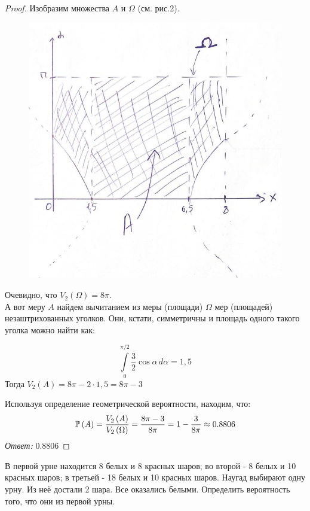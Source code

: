 \begin{proof}
Изобразим множества $ A $ и $ \Omega $ (см. рис.2).
\begin{figure}
    \centering
    \includegraphics[width=0.5\linewidth]{2.jpg}
    \caption{}
    \label{fig:enter-label}
\end{figure}
Очевидно, что $ V_2\left(\Omega\right) = 8\pi$.\\
А вот меру $ A $ найдем вычитанием из меры (площади) $ \Omega $ мер (площадей) незаштрихованных уголков. Они, кстати, симметричны и площадь одного такого уголка можно найти как:

\[
\int\limits_0^{\pi/2} \frac{3}{2}\cos{\alpha} \, d\alpha = 1,5
\]
Тогда $ V_2\left(A\right) = 8\pi - 2\cdot 1,5 = 8\pi - 3$

Используя определение геометрической вероятности, находим, что:
\[
\mathbb P\left(A\right) = \frac{V_2\left(A\right)}{V_2\left(\Omega\right)} = \frac{8\pi - 3}{8\pi} = 1 - \frac{3}{8\pi} \approx 0.8806
\]
{\it Ответ:} 0.8806
\end{proof}

\begin{problem}
В первой урне находится 8 белых и 8 красных шаров; во второй - 8 белых и 10 красных шаров; в третьей - 18 белых и 10 красных шаров. Наугад выбирают одну урну. Из неё достали 2 шара. Все оказались белыми. Определить вероятность того, что они из первой урны.\\
\end{problem}

